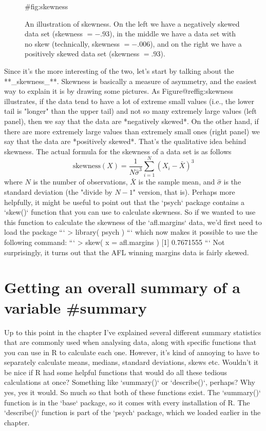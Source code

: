 \begin{figure}[t]
\begin{center}
\caption{An illustration of skewness. On the left we have a negatively skewed data set (skewness $= -.93$), in the middle we have a data set with no skew (technically, skewness $= -.006$), and on the right we have a positively skewed data set (skewness $= .93$).  }
{#fig:skewness}
\HR
\end{center}
\end{figure}


Since it's the more interesting of the two, let's start by talking about the **_skewness_**. Skewness is basically a measure of asymmetry, and the easiest way to explain it is by drawing some pictures. As Figure@reffig:skewness illustrates, if the data tend to have a lot of extreme small values (i.e., the lower tail is "longer" than the upper tail) and not so many extremely large values (left panel), then we say that the data are *negatively skewed*. On the other hand, if there are more extremely large values than extremely small ones (right panel) we say that the data are *positively skewed*. That's the qualitative idea behind skewness. The actual formula for the skewness of a data set is as follows
$$
\mbox{skewness}(X) = \frac{1}{N \hat{\sigma}^3} \sum_{i=1}^N (X_i - \bar{X})^3
$$
where $N$ is the number of observations, $\bar{X}$ is the sample mean, and $\hat{\sigma}$ is the standard deviation (the "divide by $N-1$" version, that is). Perhaps more helpfully, it might be useful to point out that the `psych` package contains a `skew()` function that you can use to calculate skewness. So if we wanted to use this function to calculate the skewness of the `afl.margins` data, we'd first need to load the package
```
> library( psych )
```
which now makes it possible to use the following command:
```
> skew( x = afl.margins )
[1] 0.7671555
```
Not surprisingly, it turns out that the AFL winning margins data is fairly skewed.

\section{Getting an overall summary of a variable {#summary}}

Up to this point in the chapter I've explained several different summary statistics that are commonly used when analysing data, along with specific functions that you can use in R to calculate each one. However, it's kind of annoying to have to separately calculate means, medians, standard deviations, skews etc. Wouldn't it be nice if R had some helpful functions that would do all these tedious calculations at once? Something like `summary()` or `describe()`, perhaps? Why yes, yes it would. So much so that both of these functions exist. The `summary()` function is in the `base` package, so it comes with every installation of R. The `describe()` function is part of the `psych` package, which we loaded earlier in the chapter.



